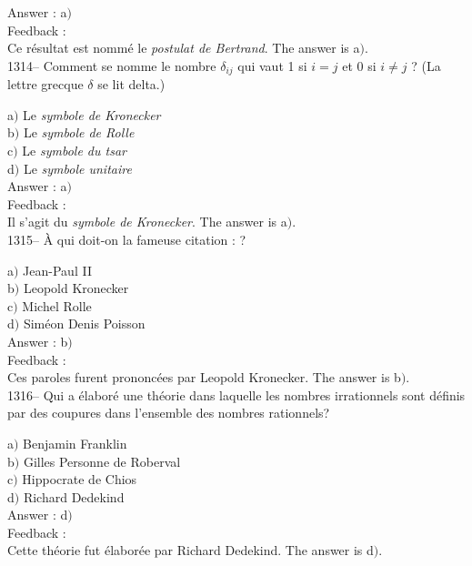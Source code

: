 \documentclass[letterpaper, 12pt]{article}
\begin{document}
Answer : a$)$\\

Feedback : \\
Ce r\'esultat est nomm\'e le {\sl postulat de Bertrand}.
The answer is  a$)$.\\


1314-- Comment se nomme le nombre $\delta_{ij}$ qui vaut 1 si $i=j$
et 0 si $i\not=j$ ? (La lettre grecque $\delta$ se lit delta.)

a$)$ Le {\sl symbole de Kronecker} \\
b$)$ Le {\sl symbole de Rolle} \\
c$)$ Le {\sl symbole du tsar}  \\
d$)$ Le {\sl symbole unitaire}\\

Answer : a$)$\\

Feedback : \\
Il s'agit du {\sl symbole de Kronecker}.
The answer is  a$)$.\\

1315-- \`A qui doit-on la fameuse citation : \fg ?

a$)$ Jean-Paul II \\
b$)$ Leopold Kronecker \\
c$)$ Michel Rolle  \\
d$)$ Sim\'eon Denis Poisson\\

Answer : b$)$\\

Feedback : \\
Ces paroles furent prononc\'ees par Leopold Kronecker.
The answer is  b$)$.\\

1316-- Qui a \'elabor\'e une th\'eorie dans laquelle les nombres
irrationnels sont d\'efinis par des coupures dans l'ensemble des
nombres rationnels?

a$)$ Benjamin Franklin \\
b$)$ Gilles Personne de Roberval \\
c$)$ Hippocrate de Chios \\
d$)$ Richard Dedekind\\

Answer : d$)$\\

Feedback : \\
Cette th\'eorie fut \'elabor\'ee par Richard Dedekind.
The answer is  d$)$.\\
\end{document}
